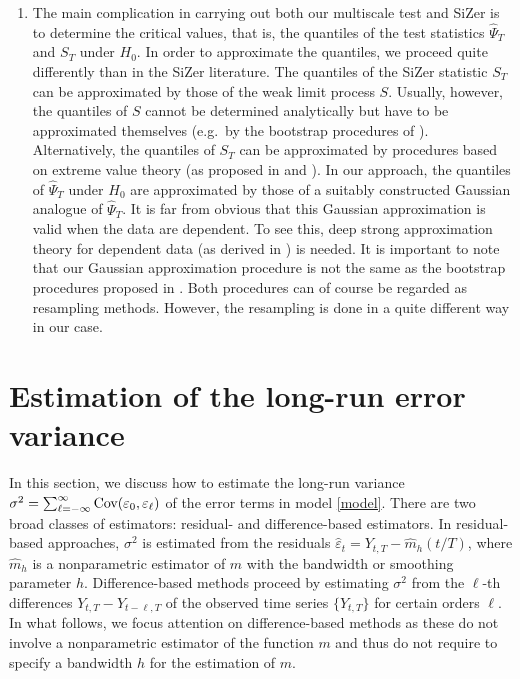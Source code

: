 \begin{enumerate}[label=(\roman*), leftmargin=0.75cm]
\item The main complication in carrying out both our multiscale test and SiZer is to determine the critical values, that is, the quantiles of the test statistics $\widehat{\Psi}_T$ and $S_T$ under $H_0$. In order to approximate the quantiles, we proceed quite differently than in the SiZer literature. The quantiles of the SiZer statistic $S_T$ can be approximated by those of the weak limit process $S$. Usually, however, the quantiles of $S$ cannot be determined analytically but have to be approximated themselves (e.g.\ by the bootstrap procedures of \cite{ChaudhuriMarron1999, ChaudhuriMarron2000}). Alternatively, the quantiles of $S_T$ can be approximated by procedures based on extreme value theory (as proposed in \cite{HannigMarron2006} and \cite{ParkHannigKang2009}). In our approach, the quantiles of $\widehat{\Psi}_T$ under $H_0$ are approximated by those of a suitably constructed Gaussian analogue of $\widehat{\Psi}_T$. It is far from obvious that this Gaussian approximation is valid when the data are dependent. To see this, deep strong approximation theory for dependent data (as derived in \cite{BerkesLiuWu2014}) is needed. It is important to note that our Gaussian approximation procedure is not the same as the bootstrap procedures proposed in \cite{ChaudhuriMarron1999, ChaudhuriMarron2000}. Both procedures can of course be regarded as resampling methods. However, the resampling is done in a quite different way in our case.

\end{enumerate}



\section{Estimation of the long-run error variance}\label{sec-error-var}


In this section, we discuss how to estimate the long-run variance $\sigma^2 = \sum\nolimits_{\ell=-\infty}^{\infty} \textnormal{Cov}(\varepsilon_0,\varepsilon_{\ell})$ of the error terms in model \eqref{model}. There are two broad classes of estimators: residual- and difference-based estimators. In residual-based approaches, $\sigma^2$ is estimated from the residuals $\widehat{\varepsilon}_t = Y_{t,T} - \widehat{m}_h(t/T)$, where $\widehat{m}_h$ is a nonparametric estimator of $m$ with the bandwidth or smoothing parameter $h$. Difference-based methods proceed by estimating $\sigma^2$ from the $\ell$-th differences $Y_{t,T} - Y_{t-\ell,T}$ of the observed time series $\{Y_{t,T}\}$ for certain orders $\ell$. In what follows, we focus attention on difference-based methods as these do not involve a nonparametric estimator of the function $m$ and thus do not require to specify a bandwidth $h$ for the estimation of $m$. 


